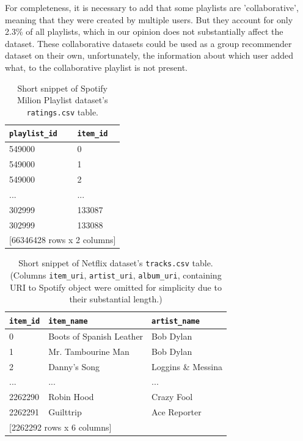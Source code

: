 For completeness, it is necessary to add that some playlists are 'collaborative', meaning that they were created by multiple users. But they account for only 2.3\% of all playlists, which in our opinion does not substantially affect the dataset. These collaborative datasets could be used as a group recommender dataset on their own, unfortunately, the information about which user added what, to the collaborative playlist is not present.

\begin{table}[!ht]
    \centering
    \begin{tabular}{ l l }
        \verb|playlist_id|   & \verb|item_id| \\
        \hline
        549000     &  0  \\
        549000     & 1  \\
        549000     & 2  \\
        ...      & ...  \\
        302999 & 133087 \\
        302999 & 133088 \\ [1mm]
        \multicolumn{2}{l}{{[66346428 rows x 2 columns]}}
    \end{tabular}
    \caption{Short snippet of Spotify Milion Playlist dataset's \texttt{ratings.csv} table.}
    \label{table:5.1_Spotify_ratings}
\end{table}


\begin{table}[!ht]
    \centering
    \begin{tabular}{ l l l }
        \verb|item_id| & \verb|item_name| & \verb|artist_name|  \\
        \hline
             0 & Boots of Spanish Leather &         Bob Dylan \\
             1 &       Mr. Tambourine Man &         Bob Dylan \\
             2 &             Danny's Song & Loggins \& Messina \\ 
           ... &                      ... &               ... \\
       2262290 &               Robin Hood &        Crazy Fool \\
       2262291 &                Guilttrip &      Ace Reporter \\ [1mm]
       \multicolumn{3}{l}{{[2262292 rows x 6 columns]}}
    \end{tabular}
    \caption[Short snippet of Netflix dataset's \texttt{tracks.csv} table.]{Short snippet of Netflix dataset's \texttt{tracks.csv} table. (Columns \texttt{item\_uri}, \texttt{artist\_uri}, \texttt{album\_uri}, containing URI to Spotify object were omitted for simplicity due to their substantial length.)}
    \label{table:5.1_Spotify_tracks}
\end{table}

